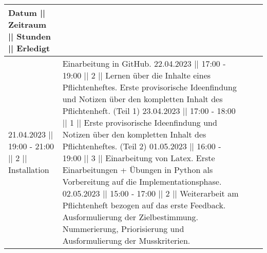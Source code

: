 \begin{tabular}{|l|l|l|l|}
\hline
Datum || Zeitraum || Stunden || Erledigt \\
\hline
    21.04.2023 || 19:00 - 21:00 || 2 || Installation & Einarbeitung in GitHub.
    22.04.2023 || 17:00 - 19:00 || 2 || Lernen über die Inhalte eines Pflichtenheftes. 
                                        Erste provisorische Ideenfindung und Notizen über den kompletten Inhalt des Pflichtenheft. (Teil 1)
    23.04.2023 || 17:00 - 18:00 || 1 || Erste provisorische Ideenfindung und Notizen über den kompletten Inhalt des Pflichtenheftes. (Teil 2)
    01.05.2023 || 16:00 - 19:00 || 3 || Einarbeitung von Latex. Erste Einarbeitungen + Übungen in Python als Vorbereitung auf die Implementationsphase.
    02.05.2023 || 15:00 - 17:00 || 2 || Weiterarbeit am Pflichtenheft bezogen auf das erste Feedback. Ausformulierung der Zielbestimmung. 
                                        Nummerierung, Priorisierung und Ausformulierung der Musskriterien.
   
\hline
\end{tabular}
